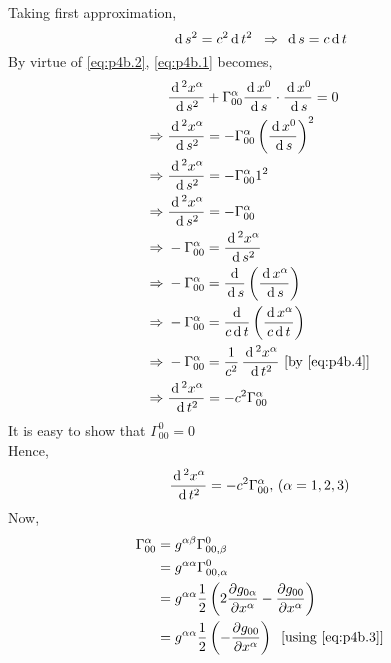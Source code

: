 \documentclass[../main-sheet.tex]{subfiles}
\begin{document}
\begin{soln}
            Taking first approximation,
            \begin{equation}
                \,\mathrm{d}\, s^2=c^2\,\mathrm{d}\, t^2\;\;\Rightarrow\;\,\mathrm{d}\, s=c\,\mathrm{d}\, t \label{eq:p4b.4}
            \end{equation}
            By virtue of \eqref{eq:p4b.2}, \eqref{eq:p4b.1} becomes,
            \begin{align*}
                & \frac{\,\mathrm{d}\,^2 x^\alpha}{\,\mathrm{d}\, s^2}+\Gamma_{00}^\alpha \frac{\,\mathrm{d}\, x^0}{\,\mathrm{d}\, s}\cdot \frac{\,\mathrm{d}\, x^0}{\,\mathrm{d}\, s}=0\\
                \Rightarrow\;& \frac{\,\mathrm{d}\,^2 x^\alpha}{\,\mathrm{d}\, s^2}=-\Gamma_{00}^\alpha \left(\frac{\,\mathrm{d}\, x^0}{\,\mathrm{d}\, s}\right)^2\\
                \Rightarrow\;& \frac{\,\mathrm{d}\,^2 x^\alpha}{\,\mathrm{d}\, s^2}=-\Gamma_{00}^\alpha 1^2\\
                \Rightarrow\;& \frac{\,\mathrm{d}\,^2 x^\alpha}{\,\mathrm{d}\, s^2}=-\Gamma_{00}^\alpha\\
                \Rightarrow\;& -\Gamma_{00}^\alpha=\frac{\,\mathrm{d}\,^2 x^\alpha}{\,\mathrm{d}\, s^2}\\
                \Rightarrow\;& -\Gamma_{00}^\alpha=\frac{\,\mathrm{d}\,}{\,\mathrm{d}\, s}\left(\frac{\,\mathrm{d}\, x^\alpha}{\,\mathrm{d}\, s}\right)\\
                \Rightarrow\;& -\Gamma_{00}^\alpha=\frac{\,\mathrm{d}\,}{c\,\mathrm{d}\, t}\left(\frac{\,\mathrm{d}\, x^\alpha}{c \,\mathrm{d}\, t}\right)\\
                \Rightarrow\;& -\Gamma_{00}^\alpha=\frac{1}{c^2}\,\frac{\,\mathrm{d}\,^2 x^\alpha}{\,\mathrm{d}\, t^2}\,\,[\text{by \eqref{eq:p4b.4}}]\\
                \Rightarrow\;&\frac{\,\mathrm{d}\,^2 x^\alpha}{\,\mathrm{d}\, t^2}= -c^2\Gamma_{00}^\alpha
            \end{align*}
            It is easy to show that \(\Gamma_{00}^0=0\)\\
            Hence,
            \begin{equation}
                \frac{\,\mathrm{d}\,^2 x^\alpha}{\,\mathrm{d}\, t^2}= -c^2\Gamma_{00}^\alpha,\,(\alpha=1,2,3)
                \label{eq:p4b.5}
            \end{equation}
            Now,
            \begin{align*}
                \Gamma_{00}^\alpha&=g^{\alpha\beta}\Gamma_{00,\beta}^0\\
                &=g^{\alpha\alpha}\Gamma_{00,\alpha}^0\\
                &=g^{\alpha\alpha}\frac{1}{2}\left( 2\frac{\partial g_{0\alpha}}{\partial x^\alpha}-\frac{\partial g_{00}}{\partial x^\alpha} \right)\\
                &=g^{\alpha\alpha}\frac{1}{2}\left( -\frac{\partial g_{00}}{\partial x^\alpha}\right)\;\;\text{[using \eqref{eq:p4b.3}]}\\

\end{align*}
\end{soln}
\end{document}
